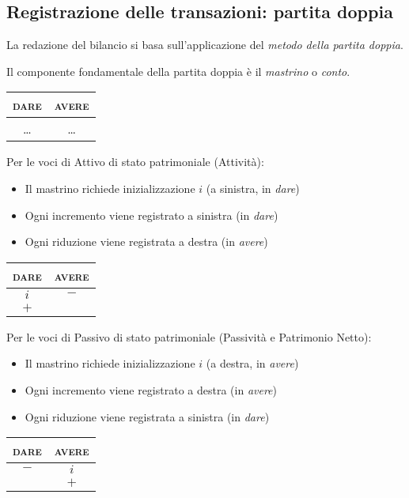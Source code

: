 \subsection{Registrazione delle transazioni: partita doppia}
La redazione del bilancio si basa sull’applicazione del \emph{metodo della partita
doppia}.

Il componente fondamentale della partita doppia è il \emph{mastrino} o \emph{conto}.

\vspace{1em}
\begin{tabular}{c|c}
    \textsc{dare} & \textsc{avere} \\
    \hline
    \dots & \dots \\
\end{tabular}
\vspace{1em}

Per le voci di Attivo di stato patrimoniale (Attività): 
\begin{itemize}
    \item Il mastrino richiede inizializzazione $i$ (a sinistra, in \emph{dare})
    \item Ogni incremento viene registrato a sinistra (in \emph{dare})
    \item Ogni riduzione viene registrata a destra (in \emph{avere})
\end{itemize}

\vspace{1em}
\begin{tabular}{c|c}
    \textsc{dare} & \textsc{avere} \\
    \hline
    $i$ & $-$ \\
    $+$ & \quad \\
\end{tabular}
\vspace{1em}

Per le voci di Passivo di stato patrimoniale (Passività e Patrimonio Netto):
\begin{itemize}
    \item Il mastrino richiede inizializzazione $i$ (a destra, in \emph{avere})
    \item Ogni incremento viene registrato a destra (in \emph{avere})
    \item Ogni riduzione viene registrata a sinistra (in \emph{dare})
\end{itemize}

\vspace{1em}
\begin{tabular}{c|c}
    \textsc{dare} & \textsc{avere} \\
    \hline
    $-$ & $i$ \\
    \quad & $+$ \\
\end{tabular}
\vspace{1em}

